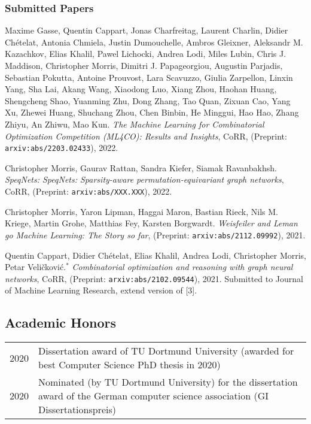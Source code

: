 \documentclass[11pt, a4paper, DIV=12]{scrartcl}
\begin{document}
\begin{thebibliography}{5}
\subsubsection*{Submitted Papers}


Maxime Gasse, Quentin Cappart, Jonas Charfreitag, Laurent Charlin, Didier Chételat, Antonia Chmiela, Justin Dumouchelle, Ambros Gleixner, Aleksandr M. Kazachkov, Elias Khalil, Pawel Lichocki, Andrea Lodi, Miles Lubin, Chris J. Maddison, Christopher Morris, Dimitri J. Papageorgiou, Augustin Parjadis, Sebastian Pokutta, Antoine Prouvost, Lara Scavuzzo, Giulia Zarpellon, Linxin Yang, Sha Lai, Akang Wang, Xiaodong Luo, Xiang Zhou, Haohan Huang, Shengcheng Shao, Yuanming Zhu, Dong Zhang, Tao Quan, Zixuan Cao, Yang Xu, Zhewei Huang, Shuchang Zhou, Chen Binbin, He Minggui, Hao Hao, Zhang Zhiyu, An Zhiwu, Mao Kun.
\emph{The Machine Learning for Combinatorial Optimization Competition (ML4CO): Results and Insights},
CoRR, (Preprint: \texttt{arxiv:abs/2203.02433}), 2022. 


Christopher Morris, Gaurav Rattan, Sandra Kiefer, Siamak Ravanbakhsh.
\emph{SpeqNets: SpeqNets: Sparsity-aware permutation-equivariant graph networks},
CoRR, (Preprint: \texttt{arxiv:abs/XXX.XXX}), 2022. 


Christopher Morris, Yaron Lipman, Haggai Maron, Bastian Rieck, Nils M. Kriege, Martin Grohe, Matthias Fey, Karsten Borgwardt.
\emph{Weisfeiler and Leman go Machine Learning: The Story so far}, (Preprint: \texttt{arxiv:abs/2112.09992}), 2021. 

Quentin Cappart, Didier Chételat, Elias Khalil, Andrea Lodi, Christopher Morris, Petar Veli\v{c}kovi\'{c}.$^*$
\emph{Combinatorial optimization and reasoning with graph neural networks},
CoRR, (Preprint: \texttt{arxiv:abs/2102.09544}), 2021. Submitted to Journal of Machine Learning Research, extend version of [3].
\end{thebibliography}

\subsection*{Academic Honors}
\begin{tabular}{p{2.1cm}p{12.0cm}}
	2020& Dissertation award of TU Dortmund University (awarded for best Computer Science PhD thesis in 2020)\\
	2020& Nominated (by TU Dortmund University) for the dissertation award of the German computer science association (GI Dissertationspreis)\\
\end{tabular}
\end{document}
